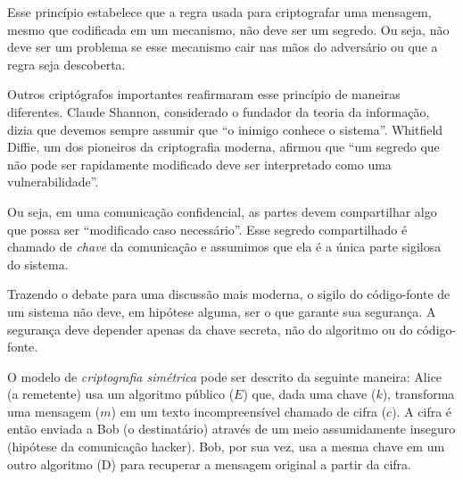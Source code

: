 Esse princípio estabelece que a regra usada para criptografar uma mensagem, mesmo que codificada em um mecanismo, não deve ser um segredo.
Ou seja, não deve ser um problema se esse mecanismo cair nas mãos do adversário ou que a regra seja descoberta.

Outros criptógrafos importantes reafirmaram esse princípio de maneiras diferentes.
Claude Shannon, considerado o fundador da teoria da informação, dizia que devemos sempre assumir que ``o inimigo conhece o sistema''.
Whitfield Diffie, um dos pioneiros da criptografia moderna, afirmou que ``um segredo que não pode ser rapidamente modificado deve ser interpretado como uma vulnerabilidade''.

Ou seja, em uma comunicação confidencial, as partes devem compartilhar algo que possa ser ``modificado caso necessário''.
Esse segredo compartilhado é chamado de {\em chave} da comunicação e assumimos que ela é a única parte sigilosa do sistema.

Trazendo o debate para uma discussão mais moderna, o sigilo do código-fonte de um sistema não deve, em hipótese alguma, ser o que garante sua segurança.
A segurança deve depender apenas da chave secreta, não do algoritmo ou do código-fonte.

O modelo de {\em criptografia simétrica} pode ser descrito da seguinte maneira:
Alice (a remetente) usa um algoritmo público ($E$) que, dada uma chave ($k$), transforma uma mensagem ($m$) em um texto incompreensível chamado de cifra ($c$).
A cifra é então enviada a Bob (o destinatário) através de um meio assumidamente inseguro (hipótese da comunicação hacker).
Bob, por sua vez, usa a mesma chave em um outro algoritmo (D) para recuperar a mensagem original a partir da cifra.

\begin{center}
\end{center}

